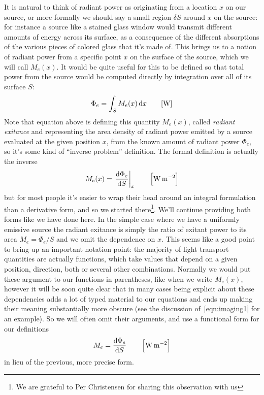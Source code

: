 It is natural to think of radiant power as originating from a location $x$ on our source,
or more formally we should say a small region $\delta S$ around $x$ on the source:
for instance a source like a stained glass window would transmit different amounts of energy 
across its surface, as a consequence of the different absorptions of the various pieces of
colored glass that it's made of. 
This brings us to a notion of radiant power from a specific point $x$ on the surface 
of the source, which we will call $M_e(x)$. 
It would be quite useful for this to be defined so that total power 
from the source would be computed directly by integration over all of its surface $S$:
\begin{equation}
	\Phi_e = \int_{S} M_e(x) \d x \qquad [\unit{\watt}]
\end{equation}
Note that equation above is defining this quantity $M_e(x)$, called \textsl{radiant exitance} 
and representing the area density of radiant power emitted by a source evaluated at the given position $x$, 
from the known amount of radiant power $\Phi_e$, so it's some kind of ``inverse problem'' definition.
The formal definition is actually the inverse
\begin{equation}
	M_e(x) = \left.\frac{\d\Phi_e}{\d S}\right|_x \qquad \left[\unit{\watt\per\square\meter}\right]
\end{equation}
but for most people it's easier to wrap their head around an integral formulation than a 
derivative form, and so we started there\footnote{
	We are grateful to Per Christensen for sharing this observation with us
}. We'll continue providing both forms like we have done here.
In the simple case where we have a uniformly emissive source the
radiant exitance is simply the ratio of exitant power to its area
$M_e = \Phi_e / S$ and we omit the dependence on $x$.
This seems like a good point to bring up an important notation point:
the majority of light transport quantities are actually functions, which take values
that depend on a given position, direction, both or several other combinations.
Normally we would put these argument to our functions in parentheses, like when we
write $M_e(x)$, however it will be soon quite clear that in many cases being explicit
about these dependencies adds a lot of typed material to our equations and ends up making their
meaning substantially more obscure (see the discussion of~\cref{eqn:imaging1} for an example).
So we will often omit their arguments, and use a functional form for our definitions
\begin{equation}
	M_e = \frac{\d\Phi_e}{\d S} \qquad \left[\unit{\watt\per\square\meter}\right]
\end{equation}
in lieu of the previous, more precise form.


